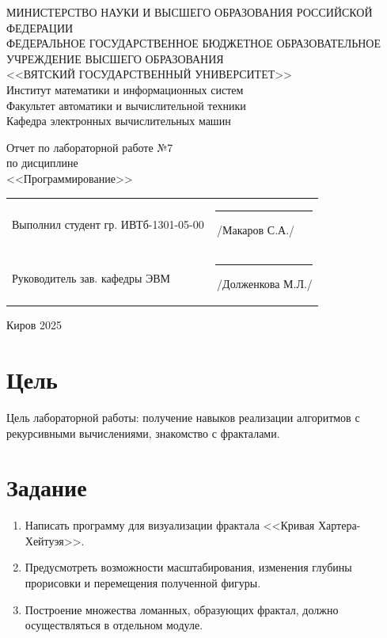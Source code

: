 \documentclass[a4paper,14pt]{extarticle}
\begin{document}
  \newpage\thispagestyle{empty}
  \begin{center}
    \MakeUppercase{
      Министерство науки и высшего образования Российской Федерации\\
      Федеральное государственное бюджетное образовательное учреждение высшего образования\\
      <<Вятский Государственный Университет>>\\
    }
    Институт математики и информационных систем\\
    Факультет автоматики и вычислительной техники\\
    Кафедра электронных вычислительных машин
  \end{center}
  \vfill

  \begin{center}
    Отчет по лабораторной работе №7\\
    по дисциплине\\
    <<Программирование>>\\
  \end{center}
  \vfill

  \noindent
  \begin{tabular}{ll}
    Выполнил студент гр. ИВТб-1301-05-00 \hspace{5mm} &
    \rule[-1mm]{25mm}{0.10mm}\,/Макаров С.А./\\
    
    Руководитель зав. кафедры ЭВМ & \rule[-1mm]{25mm}{0.10mm}\,/Долженкова М.Л./\\
  \end{tabular}

  \vfill
  \begin{center}
    Киров 2025
  \end{center}

  \newpage
  \section*{Цель}
  Цель лабораторной работы: получение навыков реализации алгоритмов с рекурсивными вычислениями, знакомство с фракталами.

  \section*{Задание}
  \begin{enumerate}
    \item Написать программу для визуализации фрактала <<Кривая Хартера-Хейтуэя>>.
    \item Предусмотреть возможности масштабирования, изменения глубины прорисовки и перемещения полученной фигуры.
    \item Построение множества ломанных, образующих фрактал, должно осуществляться в отдельном модуле.
  \end{enumerate}
\end{document}
